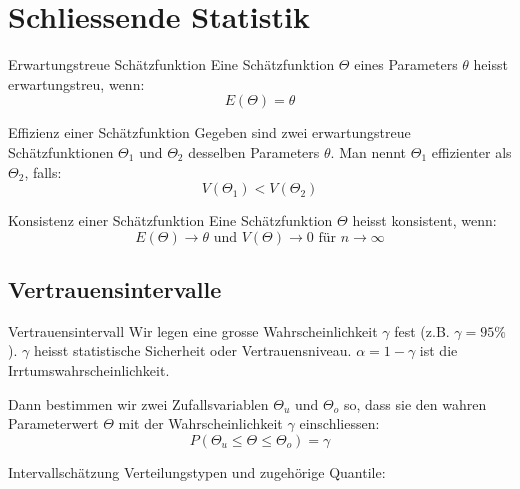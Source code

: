 \section{Schliessende Statistik}
\begin{definition}{Erwartungstreue Schätzfunktion}
Eine Schätzfunktion $\Theta$ eines Parameters $\theta$ heisst erwartungstreu, wenn:
$$
E(\Theta)=\theta
$$
\end{definition}

\begin{definition}{Effizienz einer Schätzfunktion}
Gegeben sind zwei erwartungstreue Schätzfunktionen $\Theta_1$ und $\Theta_2$ desselben Parameters $\theta$. Man nennt $\Theta_1$ effizienter als $\Theta_2$, falls:
$$
V(\Theta_1)<V(\Theta_2)
$$
\end{definition}

\begin{definition}{Konsistenz einer Schätzfunktion}
Eine Schätzfunktion $\Theta$ heisst konsistent, wenn:
$$
E(\Theta) \rightarrow \theta \text{ und } V(\Theta) \rightarrow 0 \text{ für } n \rightarrow \infty
$$
\end{definition}

\subsection{Vertrauensintervalle}
\begin{definition}{Vertrauensintervall}
Wir legen eine grosse Wahrscheinlichkeit $\gamma$ fest (z.B. $\gamma=95\%$). $\gamma$ heisst statistische Sicherheit oder Vertrauensniveau. $\alpha=1-\gamma$ ist die Irrtumswahrscheinlichkeit.

Dann bestimmen wir zwei Zufallsvariablen $\Theta_u$ und $\Theta_o$ so, dass sie den wahren Parameterwert $\Theta$ mit der Wahrscheinlichkeit $\gamma$ einschliessen:
$$
P(\Theta_u \leq \Theta \leq \Theta_o)=\gamma
$$
\end{definition}

\begin{concept}{Intervallschätzung}
Verteilungstypen und zugehörige Quantile:
\begin{center}
\end{center}
\end{concept}

